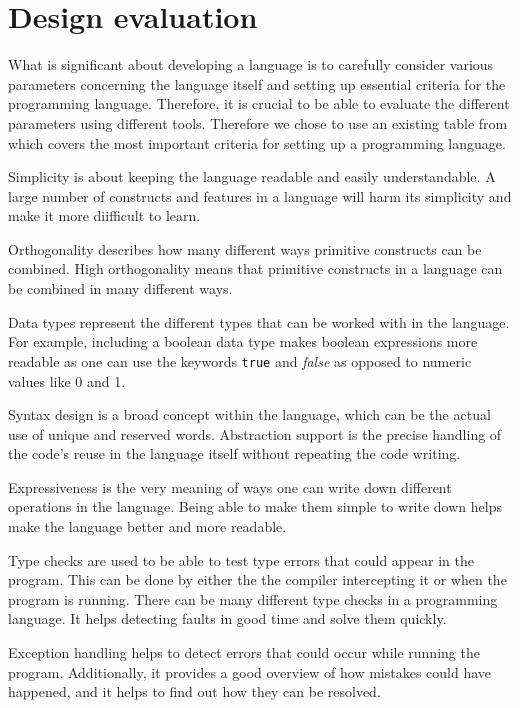 \section{Design evaluation} \label{chap:design evaluation}
What is significant about developing a language is to carefully consider various parameters concerning the language itself and setting up essential criteria for the programming language. 
Therefore, it is crucial to be able to evaluate the different parameters using different tools. Therefore we chose to use an existing table from \cite{sebesta_concepts_2016} which covers the most important criteria for setting up a programming language. 




Simplicity is about keeping the language readable and easily understandable. A large number of constructs and features in a language will harm its simplicity and make it more diifficult to learn.

Orthogonality describes how many different ways primitive constructs can be combined. High orthogonality means that primitive constructs in a language can be combined in many different ways. 

Data types represent the different types that can be worked with in the language. For example, including a boolean data type makes boolean expressions more readable as one can use the keywords \texttt{true} and \textit{false} as opposed to numeric values like 0 and 1.

Syntax design is a broad concept within the language, which can be the actual use of unique and reserved words.
Abstraction support is the precise handling of the code's reuse in the language itself without repeating the code writing.

Expressiveness is the very meaning of ways one can write down different operations in the language. Being able to make them simple to write down helps make the language better and more readable.

Type checks are used to be able to test type errors that could appear in the program. This can be done by either the the compiler intercepting it or when the program is running. There can be many different type checks in a programming language. It helps detecting faults in good time and solve them quickly.

Exception handling helps to detect errors that could occur while running the program. Additionally, it provides a good overview of how mistakes could have happened, and it helps to find out how they can be resolved.

